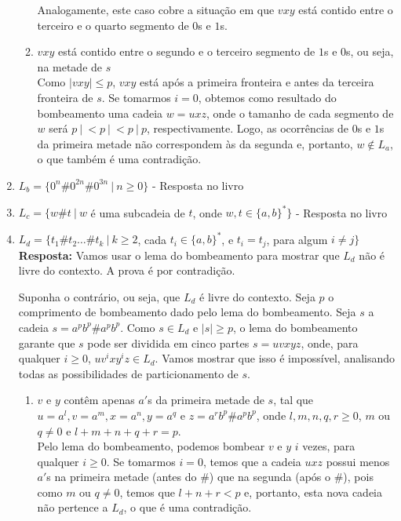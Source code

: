 \begin{enumerate}[label={\textbf{\alph*.}}]
\begin{enumerate}[label={\textbf{Caso \arabic*:}}]
        Analogamente, este caso cobre a situação em que $vxy$ está contido entre o terceiro e o quarto segmento de $0$s e $1$s.
        
        \item $vxy$ está contido entre o segundo e o terceiro segmento de $1$s e $0$s, ou seja, na metade de $s$\\[2pt]
        Como $|vxy| \leq p$, $vxy$ está após a primeira fronteira e antes da terceira fronteira de $s$. Se tomarmos $i = 0$, obtemos como resultado do bombeamento uma cadeia $w = uxz$, onde o tamanho de cada segmento de $w$ será $p\ |\ <p\ |\ <p\ |\ p$, respectivamente. Logo, as ocorrências de $0$s e $1$s da primeira metade não correspondem às da segunda e, portanto, $w \notin L_a$, o que também é uma contradição.
    \end{enumerate}
    
    \item $L_b = \{0^n\texttt{\#}0^{2n}\texttt{\#}0^{3n} \ |\ n \geq 0\}$ - Resposta no livro
    
    \item $L_c = \{w\texttt{\#}t \ |\ w$ é uma subcadeia de $t$, onde $w, t \in \{a, b\}^*\}$ - Resposta no livro
    
    \item $L_d = \{t_1\texttt{\#}t_2 \ldots \texttt{\#}t_k \ |\ k \geq 2$, cada $t_i \in \{a, b\}^*$, e $t_i = t_j$, para algum $i\neq j\}$\\[3pt]
    \textbf{Resposta:} Vamos usar o lema do bombeamento para mostrar que $L_d$ não é livre do contexto. A prova é por contradição.
    
    Suponha o contrário, ou seja, que $L_d$ é livre do contexto. Seja $p$ o comprimento de bombeamento dado pelo lema do bombeamento. Seja $s$ a cadeia $s = a^pb^p\texttt{\#}a^pb^p$. Como $s \in L_d$ e $|s| \geq p$, o lema do bombeamento garante que $s$ pode ser dividida em cinco partes $s = uvxyz$, onde, para qualquer $i \geq 0$, $uv^ixy^iz \in L_d$. Vamos mostrar que isso é impossível, analisando todas as possibilidades de particionamento de $s$.
    
    \begin{enumerate}[label={\textbf{Caso \arabic*:}}]
        \item $v$ e $y$ contêm apenas $a'$s da primeira metade de $s$, tal que $u = a^l, v = a^m, x = a^n, y = a^q$ e $z = a^rb^p\texttt{\#}a^pb^p$, onde $l, m, n, q, r \geq 0$, $m$ ou $q \neq 0$ e $l + m + n + q + r = p$.\\[2pt]
        Pelo lema do bombeamento, podemos bombear $v$ e $y$ $i$ vezes, para qualquer $i \geq 0$. Se tomarmos $i = 0$, temos que a cadeia $uxz$ possui menos $a'$s na primeira metade (antes do $\texttt{\#}$) que na segunda (após o $\texttt{\#}$), pois como $m$ ou $q \neq 0$, temos que $l + n + r < p$ e, portanto, esta nova cadeia não pertence a $L_d$, o que é uma contradição.
        

\end{enumerate}
\end{enumerate}
